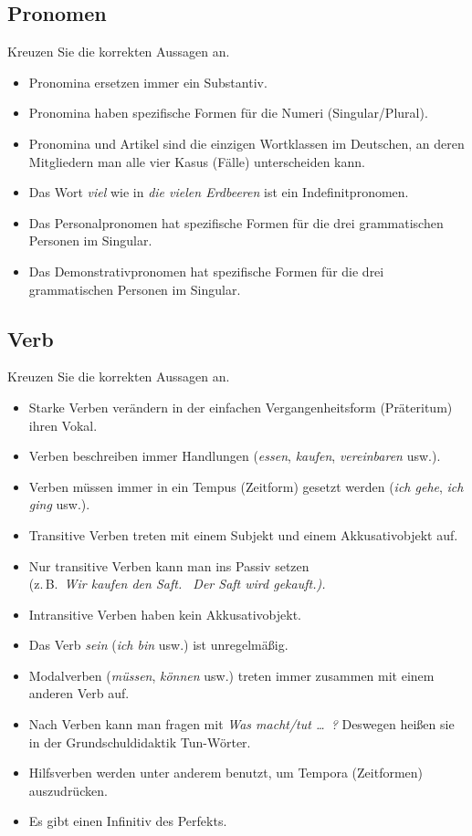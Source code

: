 \documentclass[12pt,a4paper,twoside]{article}
\newcommand{\Lf}{
  \setlength{\itemsep}{1pt}
  \setlength{\parskip}{0pt}
  \setlength{\parsep}{0pt}
}
\begin{document}

\subsection{Pronomen}

Kreuzen Sie die korrekten Aussagen an.

\begin{itemize}[label=\Square]\Lf
  \item Pronomina ersetzen immer ein Substantiv.
  \item Pronomina haben spezifische Formen für die Numeri (Singular\slash Plural).
  \item Pronomina und Artikel sind die einzigen Wortklassen im Deutschen, an deren Mitgliedern man alle vier Kasus (Fälle) unterscheiden kann.
  \item Das Wort \textit{viel} wie in \textit{die vielen Erdbeeren} ist ein Indefinitpronomen.
  \item Das Personalpronomen hat spezifische Formen für die drei grammatischen Personen im Singular.
  \item Das Demonstrativpronomen hat spezifische Formen für die drei grammatischen Personen im Singular.
\end{itemize}

\subsection{Verb}

Kreuzen Sie die korrekten Aussagen an.

\begin{itemize}[label=\Square]\Lf
  \item Starke Verben verändern in der einfachen Vergangenheitsform (Präteritum) ihren Vokal.
  \item Verben beschreiben immer Handlungen (\textit{essen}, \textit{kaufen}, \textit{vereinbaren} usw.).
  \item Verben müssen immer in ein Tempus (Zeitform) gesetzt werden (\textit{ich gehe}, \textit{ich ging} usw.).
  \item Transitive Verben treten mit einem Subjekt und einem Akkusativobjekt auf.
  \item Nur transitive Verben kann man ins Passiv setzen\\
    (z.\,B.\ \textit{Wir kaufen den Saft. \ Der Saft wird gekauft.).}
  \item Intransitive Verben haben kein Akkusativobjekt.
  \item Das Verb \textit{sein} (\textit{ich bin} usw.) ist unregelmäßig.
  \item Modalverben (\textit{müssen}, \textit{können} usw.) treten immer zusammen mit einem anderen Verb auf.
  \item Nach Verben kann man fragen mit \textit{Was macht\slash tut \ldots\ ?}
    Deswegen heißen sie in der Grundschuldidaktik Tun-Wörter.
  \item Hilfsverben werden unter anderem benutzt, um Tempora (Zeitformen) auszudrücken.
  \item Es gibt einen Infinitiv des Perfekts.
\end{itemize}
\end{document}
